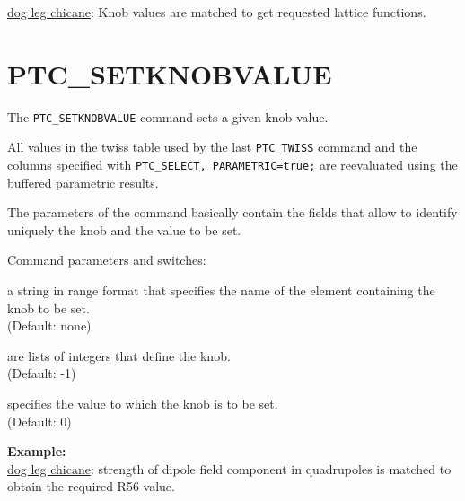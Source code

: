 \href{http://cern.ch/frs/mad-X_examples/ptc_madx_interface/matchknobs/matchknobs.madx}{dog
  leg chicane}: Knob values are matched to get requested lattice
functions.



%


\section{PTC\_SETKNOBVALUE}
\label{sec:ptc-setknobvalue}

The \texttt{PTC\_SETKNOBVALUE} command sets a given knob value.


All values in the twiss table used by the last \texttt{PTC\_TWISS}
command and the columns specified with
\hyperref[sec:ptc-select]{\texttt{PTC\_SELECT, PARAMETRIC=true;}}  are
reevaluated using the buffered parametric results.

The parameters of the command basically contain the fields that allow
to identify uniquely the knob and the value to be set.

Command parameters and switches:
\begin{madlist}
    a string in range format that specifies the name
   of the element containing the knob to be set. \\
     (Default: none)

    are lists of integers that define the knob.\\
   (Default: -1)

    specifies the value to which the knob is to be set.\\
   (Default: 0)
\end{madlist}

\textbf{Example:}\\
\href{http://cern.ch/frs/mad-X_examples/ptc_madx_interface/matchknobs/matchknobs.madx}{dog
  leg chicane}: strength of dipole field component in quadrupoles is
matched to obtain the required R56 value.


